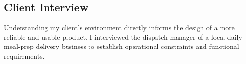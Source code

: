\documentclass[11pt]{article}
\begin{document}

\subsection{Client Interview}
Understanding my client's environment directly informs the design of a more reliable and usable product. I interviewed the dispatch manager of a local daily meal-prep delivery business to establish operational constraints and functional requirements.

\newcommand{\rangeofdeliveries}{40 to 60}
\newcommand{\numberofvehicles}{three delivery vans.}
\end{document}
